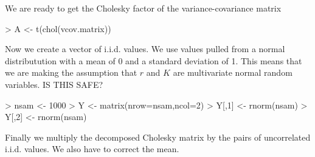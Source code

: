 \documentclass[a4paper]{article}
\begin{document}
We are ready to get the Cholesky factor of the variance-covariance matrix
\begin{center}
\begin{minipage}[H]{0.95\textwidth}%
\begin{shaded}%
\begin{Schunk}
\begin{Sinput}
> A <- t(chol(vcov.matrix))
\end{Sinput}
\end{Schunk}
\end{shaded}%
\end{minipage}
\end{center}

Now we create a vector of i.i.d. values. We use values pulled from a normal distributution with a mean of 0 and a standard deviation of 1. This means that we are making the assumption that $r$ and $K$ are multivariate normal random variables.
IS THIS SAFE?  

\begin{center}
\begin{minipage}[H]{0.95\textwidth}%
\begin{shaded}%
\begin{Schunk}
\begin{Sinput}
> nsam <- 1000
> Y <- matrix(nrow=nsam,ncol=2)
> Y[,1] <- rnorm(nsam)
> Y[,2] <- rnorm(nsam)
\end{Sinput}
\end{Schunk}
\end{shaded}%
\end{minipage}
\end{center}

Finally we multiply the decomposed Cholesky matrix by the pairs of uncorrelated
i.i.d. values. We also have to correct the mean.

\begin{center}
\begin{minipage}[H]{0.95\textwidth}%
\begin{shaded}%
\begin{Schunk}
\end{Schunk}
\end{shaded}%
\end{minipage}
\end{center}
\end{document}
